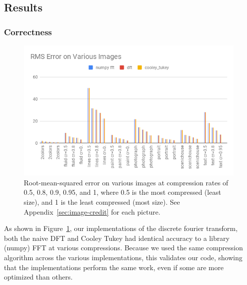 \subsection{Results}
		\subsubsection{Correctness}
		\begin{figure}[h]
			\vspace{-5mm}
			\includegraphics[width=\linewidth]{images/accuracy.png}
			\caption{Root-mean-squared error on various images at compression rates of 0.5, 0.8, 0.9, 0.95, and 1, where 0.5 is the most compressed (least size), and 1 is the least compressed (most size). See Appendix~\ref{sec:image-credit} for each picture.}
			\label{fig:accuracy}
		\end{figure}

		As shown in Figure~\ref{fig:accuracy}, our implementations of the discrete fourier transform, both the naive DFT and Cooley Tukey had identical accuracy to a library (numpy) FFT at various compressions. Because we used the same compression algorithm across the various implementations, this validates our code, showing that the implementations perform the same work, even if some are more optimized than others.

